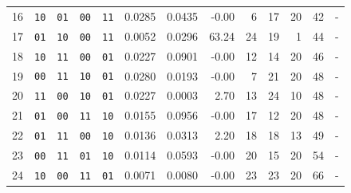 \begin{center}
{\begin{tabular}{rccccrrrrrrrl}
16 & \texttt{10} & \texttt{01} & \texttt{00} & \texttt{11} & 0.0285 & 0.0435 & -0.00 & 6 & 17 & 20 & 42 & - \\
17 & \texttt{01} & \texttt{10} & \texttt{00} & \texttt{11} & 0.0052 & 0.0296 & 63.24 & 24 & 19 & 1 & 44 & - \\
18 & \texttt{10} & \texttt{11} & \texttt{00} & \texttt{01} & 0.0227 & 0.0901 & -0.00 & 12 & 14 & 20 & 46 & - \\
19 & \texttt{00} & \texttt{11} & \texttt{10} & \texttt{01} & 0.0280 & 0.0193 & -0.00 & 7 & 21 & 20 & 48 & - \\
20 & \texttt{11} & \texttt{00} & \texttt{10} & \texttt{01} & 0.0227 & 0.0003 & 2.70 & 13 & 24 & 10 & 48 & - \\
21 & \texttt{01} & \texttt{00} & \texttt{11} & \texttt{10} & 0.0155 & 0.0956 & -0.00 & 17 & 12 & 20 & 48 & - \\
22 & \texttt{01} & \texttt{11} & \texttt{00} & \texttt{10} & 0.0136 & 0.0313 & 2.20 & 18 & 18 & 13 & 49 & - \\
23 & \texttt{00} & \texttt{11} & \texttt{01} & \texttt{10} & 0.0114 & 0.0593 & -0.00 & 20 & 15 & 20 & 54 & - \\
24 & \texttt{10} & \texttt{00} & \texttt{11} & \texttt{01} & 0.0071 & 0.0080 & -0.00 & 23 & 23 & 20 & 66 & - \\
\bottomrule
\end{tabular}
}
\end{center}
